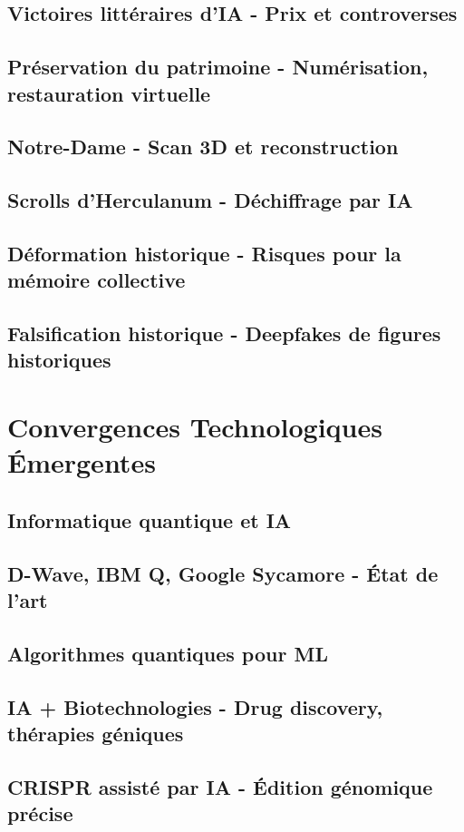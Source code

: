 \documentclass[12pt,a4paper]{book}
\begin{document}
\section{Victoires littéraires d'IA - Prix et controverses}
\section{Préservation du patrimoine - Numérisation, restauration virtuelle}
\section{Notre-Dame - Scan 3D et reconstruction}
\section{Scrolls d'Herculanum - Déchiffrage par IA}
\section{Déformation historique - Risques pour la mémoire collective}
\section{Falsification historique - Deepfakes de figures historiques}

\chapter{Convergences Technologiques Émergentes}
\section{Informatique quantique et IA}
\section{D-Wave, IBM Q, Google Sycamore - État de l'art}
\section{Algorithmes quantiques pour ML}
\section{IA + Biotechnologies - Drug discovery, thérapies géniques}
\section{CRISPR assisté par IA - Édition génomique précise}
\end{document}
